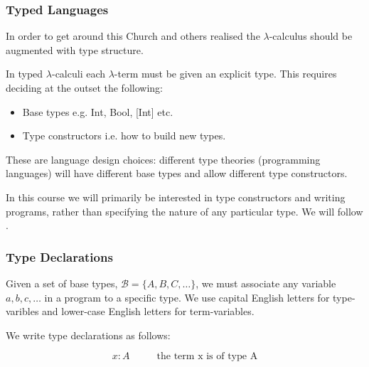 \documentclass{beamer}
\theoremstyle{indentDefn} \newtheorem{defn}[]{Definition}
\begin{document}
\begin{frame}
	\frametitle{Typed Languages}

  In order to get around this Church and others realised the $\lambda$-calculus should be augmented with type structure. 

  In typed $\lambda$-calculi each $\lambda$-term must be given an explicit type. This requires deciding at the outset the following: 

  \begin{itemize}
    \item Base types e.g. Int, Bool, [Int] etc. 
    \item Type constructors i.e. how to build new types.
  \end{itemize}

  These are language design choices: different type theories (programming languages) will have different base types and allow different type constructors. 

  In this course we will primarily be interested in type constructors and writing programs, rather than specifying the nature of any particular type. We will follow \cite{thompson}. 

\end{frame}

\begin{frame}
  \frametitle{Type Declarations}

  Given a set of base types, $\mathcal{B} = \{A,B,C,\dots\}$, we must associate any variable $a,b,c,\dots$ in a program to a specific type. We use capital English letters for type-varibles and lower-case English letters for term-variables. 

  We write type declarations as follows: 
  
  $$ x : A \hspace{1cm} \text{ the term x is of type A}$$


  \vspace{2cm}

\end{frame}
\end{document}
